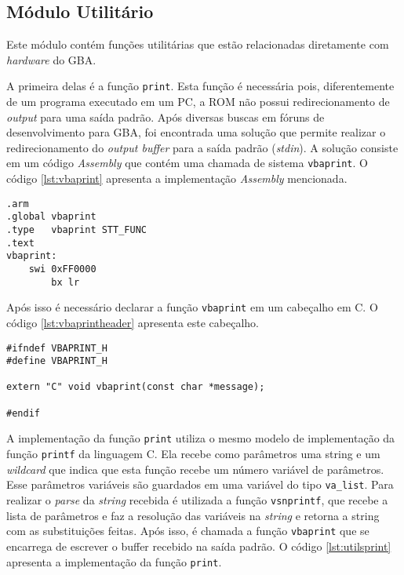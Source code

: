 \subsection{Módulo Utilitário}

Este módulo contém funções utilitárias que estão relacionadas diretamente com \textit{hardware} do GBA.

A primeira delas é a função \texttt{print}. Esta função é necessária pois, diferentemente de um programa executado em um PC, a ROM não possui redirecionamento de \textit{output} para uma saída padrão. Após diversas buscas em fóruns de desenvolvimento para GBA, foi encontrada uma solução que permite realizar o redirecionamento do \textit{output buffer} para a saída padrão (\textit{stdin}). A solução consiste em um código \textit{Assembly} que contém uma chamada de sistema \texttt{vbaprint}. O código \ref{lst:vbaprint} apresenta a implementação \textit{Assembly} mencionada.

\begin{lstlisting}[label={lst:vbaprint}, caption={Código \textit{Assembly} para a função \texttt{vbaprint}}]
.arm
.global vbaprint
.type   vbaprint STT_FUNC
.text
vbaprint:
    swi 0xFF0000
        bx lr
\end{lstlisting}

Após isso é necessário declarar a função \texttt{vbaprint} em um cabeçalho em C. O código \ref{lst:vbaprintheader} apresenta este cabeçalho.

\begin{lstlisting}[label={lst:vbaprintheader}, caption={Cabeçalho da função \texttt{vbaprint}}]
#ifndef VBAPRINT_H
#define VBAPRINT_H

extern "C" void vbaprint(const char *message);

#endif
\end{lstlisting}

A implementação da função \texttt{print} utiliza o mesmo modelo de implementação da função \texttt{printf} da linguagem C. Ela recebe como parâmetros uma string e um \textit{wildcard} que indica que esta função recebe um número variável de parâmetros. Esse parâmetros variáveis são guardados em uma variável do tipo \texttt{va\_list}. Para realizar o \textit{parse} da \textit{string} recebida é utilizada a função \texttt{vsnprintf}, que recebe a lista de parâmetros e faz a resolução das variáveis na \textit{string} e retorna a string com as substituições feitas. Após isso, é chamada a função \texttt{vbaprint} que se encarrega de escrever o buffer recebido na saída padrão. O código \ref{lst:utilsprint} apresenta a implementação da função \texttt{print}.

